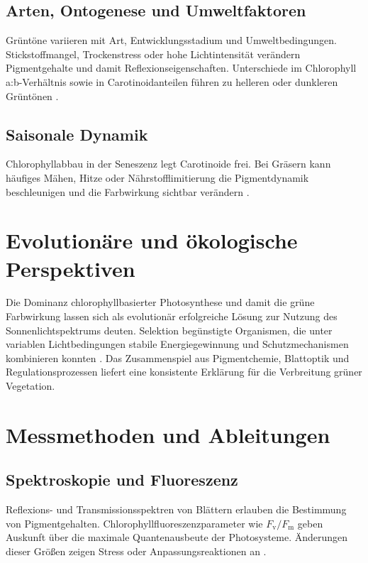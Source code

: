 \subsection{Arten, Ontogenese und Umweltfaktoren}
Grüntöne variieren mit Art, Entwicklungsstadium und Umweltbedingungen. Stickstoffmangel, Trockenstress oder hohe Lichtintensität verändern Pigmentgehalte und damit Reflexionseigenschaften. Unterschiede im Chlorophyll a:b-Verhältnis sowie in Carotinoidanteilen führen zu helleren oder dunkleren Grüntönen \parencite{schmidt2015chlorophyll, gao2010lightabsorption}.

\subsection{Saisonale Dynamik}
Chlorophyllabbau in der Seneszenz legt Carotinoide frei. Bei Gräsern kann häufiges Mähen, Hitze oder Nährstofflimitierung die Pigmentdynamik beschleunigen und die Farbwirkung sichtbar verändern \parencite{schmidt2015chlorophyll}.

\section{Evolutionäre und ökologische Perspektiven}
Die Dominanz chlorophyllbasierter Photosynthese und damit die grüne Farbwirkung lassen sich als evolutionär erfolgreiche Lösung zur Nutzung des Sonnenlichtspektrums deuten. Selektion begünstigte Organismen, die unter variablen Lichtbedingungen stabile Energiegewinnung und Schutzmechanismen kombinieren konnten \parencite{schmidt2015chlorophyll, renoult2017evolution}. Das Zusammenspiel aus Pigmentchemie, Blattoptik und Regulationsprozessen liefert eine konsistente Erklärung für die Verbreitung grüner Vegetation.

\section{Messmethoden und Ableitungen}

\subsection{Spektroskopie und Fluoreszenz}
Reflexions- und Transmissionsspektren von Blättern erlauben die Bestimmung von Pigmentgehalten. Chlorophyllfluoreszenzparameter wie $F_\mathrm{v}/F_\mathrm{m}$ geben Auskunft über die maximale Quantenausbeute der Photosysteme. Änderungen dieser Größen zeigen Stress oder Anpassungsreaktionen an \parencite{zhao2012chlorophyll, gao2010lightabsorption}.

